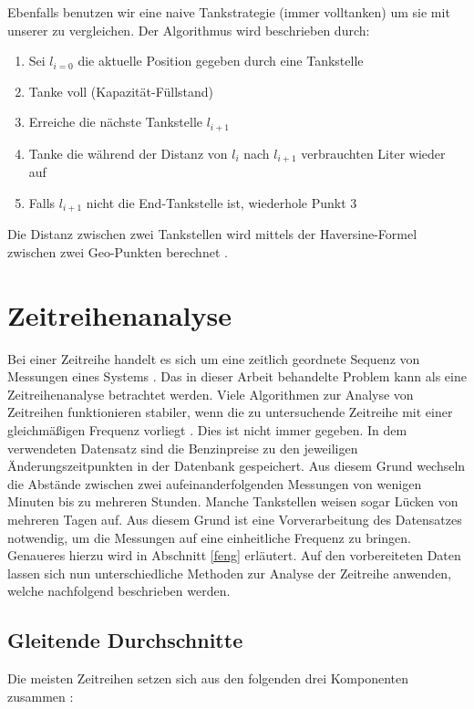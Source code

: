 \documentclass[
ngerman          %
,a4paper          %
,11pt
,pdftex
]{report}
\begin{document}
Ebenfalls benutzen wir eine naive Tankstrategie (immer volltanken) um sie mit unserer zu vergleichen. Der Algorithmus wird beschrieben durch:

\begin{enumerate}
\item Sei $l_{i=0}$ die aktuelle Position gegeben durch eine Tankstelle
\item Tanke voll (Kapazität-Füllstand)
\item Erreiche die nächste Tankstelle $l_{i+1}$
\item Tanke die während der Distanz von $l_{i}$ nach $l_{i+1}$ verbrauchten Liter wieder auf
\item Falls $l_{i+1}$ nicht die End-Tankstelle ist, wiederhole Punkt $3$
\end{enumerate}

Die Distanz zwischen zwei Tankstellen wird mittels der Haversine-Formel zwischen zwei Geo-Punkten berechnet \cite{haversine}.

\section{Zeitreihenanalyse}
Bei einer Zeitreihe handelt es sich um eine zeitlich geordnete Sequenz von Messungen eines Systems \cite[145]{thinkstats}. Das in dieser Arbeit behandelte Problem kann als eine Zeitreihenanalyse betrachtet werden. Viele Algorithmen zur Analyse von Zeitreihen funktionieren stabiler, wenn die zu untersuchende Zeitreihe mit einer gleichmäßigen Frequenz vorliegt \cite[146]{thinkstats}. Dies ist nicht immer gegeben. In dem verwendeten Datensatz sind die Benzinpreise zu den jeweiligen Änderungszeitpunkten in der Datenbank gespeichert. Aus diesem Grund wechseln die Abstände zwischen zwei aufeinanderfolgenden Messungen von wenigen Minuten bis zu mehreren Stunden. Manche Tankstellen weisen sogar Lücken von mehreren Tagen auf. Aus diesem Grund ist eine Vorverarbeitung des Datensatzes notwendig, um die Messungen auf eine einheitliche Frequenz zu bringen. Genaueres hierzu wird in Abschnitt \ref{feng} erläutert. Auf den vorbereiteten Daten lassen sich nun unterschiedliche Methoden zur Analyse der Zeitreihe anwenden, welche nachfolgend beschrieben werden.

\subsection{Gleitende Durchschnitte}
Die meisten Zeitreihen setzen sich aus den folgenden drei Komponenten zusammen \cite[151]{thinkstats}:
\end{document}
